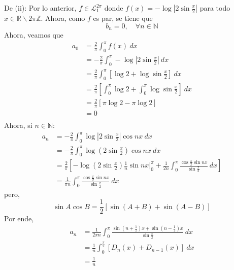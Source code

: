 \documentclass[12pt]{report}
\theoremstyle{largebreak}
\newcommand\abs[1]{\ensuremath{\left|#1\right|}}
\begin{document}
\begin{sol}
        De (ii): Por lo anterior, $f\in\mathcal{L}_1^{2\pi}$ donde $f(x)=-\log\abs{2\sin\frac{x}{2}}$ para todo $x\in\mathbb{R}\backslash2\pi\mathbb{Z}$. Ahora, como $f$ es par, se tiene que
        \begin{equation*}
            b_n=0,\quad\forall n\in\mathbb{N}
        \end{equation*}
        Ahora, veamos que
        \begin{equation*}
            \begin{split}
                a_0&=\frac{2}{\pi}\int_0^\pi f(x)\:dx\\
                &=-\frac{2}{\pi}\int_0^\pi -\log\abs{2\sin\frac{x}{2}}\:dx\\
                &=\frac{2}{\pi}\int_0^\pi \left[\log2+\log\sin\frac{x}{2}\right]\:dx\\
                &=\frac{2}{\pi}\left[\int_0^\pi\log2+\int_0^\pi\log\sin\frac{x}{2}\right]\:dx\\
                &=\frac{2}{\pi}\left[\pi\log2-\pi\log2\right]\\
                &=0\\
            \end{split}
        \end{equation*}
        Ahora, si $n\in\mathbb{N}$:
        \begin{equation*}
            \begin{split}
                a_n&=-\frac{2}{\pi}\int_0^{\pi}\log\abs{2\sin\frac{x}{2}}\cos nx\:dx\\
                &=-\frac{2}{\pi}\int_0^{\pi}\log\left(2\sin\frac{x}{2}\right)\cos nx\:dx\\
                &=\frac{2}{\pi}\left[-\log\left(2\sin\frac{x}{2}\right)\frac{1}{n}\sin nx\Big|_0^{\pi}+\frac{1}{2n}\int_0^{\pi}\frac{\cos\frac{x}{2}\sin nx}{\sin\frac{x}{2}}\:dx \right]\\
                &=\frac{1}{\pi n}\int_0^{\pi}\frac{\cos\frac{x}{2}\sin nx}{\sin\frac{x}{2}}\:dx
            \end{split}
        \end{equation*}
        pero,
        \begin{equation*}
            \sin A\cos B=\frac{1}{2}\left[\sin(A+B)+\sin(A-B) \right]
        \end{equation*}
        Por ende,
        \begin{equation*}
            \begin{split}
                a_n&=\frac{1}{2\pi n}\int_0^{\pi}\frac{\sin\left(n+\frac{1}{2}\right)x+\sin\left(n-\frac{1}{2}\right)x}{\sin\frac{x}{2}}\:dx\\
                &=\frac{1}{n}\int_0^{\frac{\pi}{2}}\left[D_n(x)+D_{ n-1}(x)\right]\:dx\\
                &=\frac{1}{n}\\
            \end{split}
        \end{equation*}


\end{sol}
\end{document}
